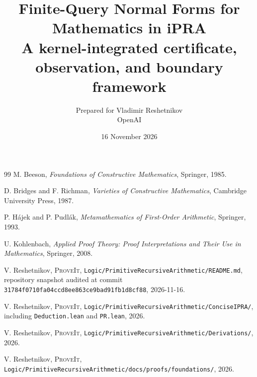 \documentclass[11pt]{article}
\title{\textbf{Finite-Query Normal Forms for Mathematics in iPRA}\\
\large A kernel-integrated certificate, observation, and boundary framework}
\author{Prepared for Vladimir Reshetnikov\\OpenAI}
\date{16 November 2026}
\theoremstyle{definition}
\theoremstyle{remark}
\newcommand{\repo}{\textsc{ProveIt}}
\newcommand{\pathref}[1]{\nolinkurl{#1}}
\begin{document}
\maketitle

\begin{abstract}

\end{abstract}

\tableofcontents
\newpage



















\appendix




\begin{thebibliography}{99}
M. Beeson, \emph{Foundations of Constructive Mathematics}, Springer, 1985.

D. Bridges and F. Richman, \emph{Varieties of Constructive Mathematics},
Cambridge University Press, 1987.

P. H\'ajek and P. Pudl\'ak, \emph{Metamathematics of First-Order Arithmetic},
Springer, 1993.

U. Kohlenbach, \emph{Applied Proof Theory: Proof Interpretations and Their Use
in Mathematics}, Springer, 2008.

V. Reshetnikov, \repo, \pathref{Logic/PrimitiveRecursiveArithmetic/README.md},
repository snapshot audited at commit
\pathref{31784f0710fa04ccd8ee863ce9bad91fb1d8cf88}, 2026-11-16.

V. Reshetnikov, \repo, \pathref{Logic/PrimitiveRecursiveArithmetic/ConciseIPRA/},
including \pathref{Deduction.lean} and \pathref{PR.lean}, 2026.

V. Reshetnikov, \repo,
\pathref{Logic/PrimitiveRecursiveArithmetic/Derivations/}, 2026.

V. Reshetnikov, \repo,
\pathref{Logic/PrimitiveRecursiveArithmetic/docs/proofs/foundations/}, 2026.
\end{thebibliography}
\end{document}
